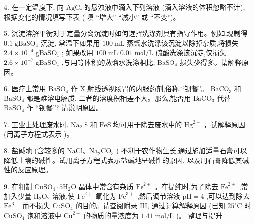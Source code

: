 \documentclass[10pt]{article}
\begin{document}
4. 在一定温度下, 向 \(\mathrm{{AgCl}}\) 的悬浊液中滴入下列溶液 (滴入溶液的体积忽略不计),根据变化的情况填写下表 ( 填 “增大” “减小” 或 “不变”)。

\begin{center}
\end{center}

5. 沉淀溶解平衡对于定量分离沉淀时如何选择洗涤剂具有指导作用。例如,现制得 \({0.1}\mathrm{\;g}{\mathrm{{BaSO}}}_{4}\) 沉淀, 常温下如果用 \({100}\mathrm{\;{mL}}\) 蒸馏水洗涤该沉淀以除掉杂质,将损失 \({2.4} \times {10}^{-4}\mathrm{\;g}{\mathrm{{BaSO}}}_{4}\) ; 如果改用 \({100}\mathrm{\;{mL}}\) \({0.01}\mathrm{\;{mol}}/\mathrm{L}\) 硫酸洗涤该沉淀,仅损失 \({2.6} \times {10}^{-7}\mathrm{\;g}{\mathrm{{BaSO}}}_{4}\) ,与用等体积的蒸馏水洗涤相比, \({\mathrm{{BaSO}}}_{4}\) 损失少得多。请解释原因。

6. 医疗上常用 \({\mathrm{{BaSO}}}_{4}\) 作 \(\mathrm{X}\) 射线透视肠胃的内服药剂,俗称 “钡餐”。 \({\mathrm{{BaCO}}}_{3}\) 和 \({\mathrm{{BaSO}}}_{4}\) 都是难溶电解质, 二者的溶度积相差不大。那么,能否用 \({\mathrm{{BaCO}}}_{3}\) 代替 \({\mathrm{{BaSO}}}_{4}\) 作 “钡餐”? 请说明原因。

7. 工业上处理废水时, \({\mathrm{{Na}}}_{2}\mathrm{\;S}\) 和 \(\mathrm{{FeS}}\) 均可用于除去废水中的 \({\mathrm{{Hg}}}^{2 + }\) ，试解释原因 (用离子方程式表示 )。

8. 盐碱地 (含较多的 \(\mathrm{{NaCl}}\text{、}{\mathrm{{Na}}}_{2}{\mathrm{{CO}}}_{3}\) ) 不利于农作物生长,通过施加适量石膏可以降低土壤的碱性。试用离子方程式表示盐碱地呈碱性的原因, 以及用石膏降低其碱性的反应原理。

9. 在粗制 \({\mathrm{{CuSO}}}_{4} \cdot 5{\mathrm{H}}_{2}\mathrm{O}\) 晶体中常含有杂质 \({\mathrm{{Fe}}}^{2 + }\) 。在提纯时,为了除去 \({\mathrm{{Fe}}}^{2 + }\) ,常加入少量 \({\mathrm{H}}_{2}{\mathrm{O}}_{2}\) 溶液,使 \({\mathrm{{Fe}}}^{2 + }\) 氧化为 \({\mathrm{{Fe}}}^{3 + }\) ,然后调节溶液 \(\mathrm{{pH}} = 4\) ,可以达到除去 \({\mathrm{{Fe}}}^{3 + }\) 而不损失 \({\mathrm{{CuSO}}}_{4}\) 的目的。请查阅附录 III, 通过计算解释原因 (已知 \({25}^{ \circ }\mathrm{C}\) 时 \({\mathrm{{CuSO}}}_{4}\) 饱和溶液中 \({\mathrm{{Cu}}}^{2 + }\) 的物质的量浓度为 \({1.41}\mathrm{\;{mol}}/\mathrm{L}\) )。 整理与提升
\end{document}
